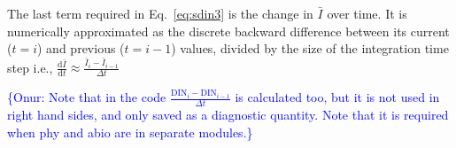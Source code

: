 \documentclass[gmd, manuscript]{copernicus}
\newcommand{\onur}[1]{\textcolor{blue}{\{Onur: #1\}}}
\begin{document}
The last term required in Eq.~\ref{eq:sdin3} is the change in $\bar{I}$ over time.
It is numerically approximated as the discrete backward difference between its current ($t=i$) and previous ($t=i-1$) values, divided by the size of the integration time step i.e., $\frac{\text{d} \bar{I}}{\text{d} t} \approx \frac{\bar{I}_{i} - \bar{I}_{i-1}}{\Delta t}$ 

\onur{Note that in the code $\frac{\text{DIN}_{i} - \text{DIN}_{i-1}}{\Delta t}$ is calculated too, but it is not used in right hand sides, and only saved as a diagnostic quantity. Note that it is required when phy and abio are in separate modules.}









\end{document}
